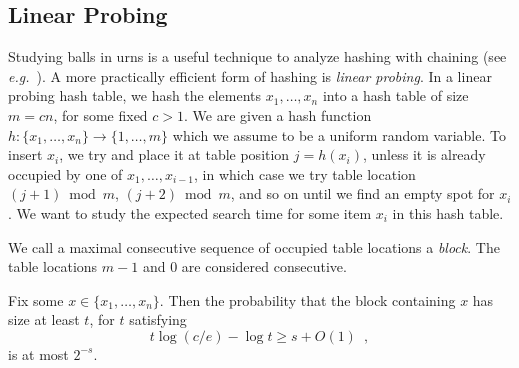 \documentclass{patmorin}
\begin{document}
\subsection{Linear Probing}

Studying balls in urns is a useful technique to analyze hashing with
chaining (see \emph{e.g.}~\cite[Section~5.1]{morin:open}). A more
practically efficient form of hashing is \emph{linear probing}.  In a
linear probing hash table, we hash the elements $x_1, \ldots, x_n$
into a hash table of size $m=cn$, for some fixed $c> 1$. We are given
a hash function $h : \{x_1, \ldots, x_n\} \to \{1, \ldots, m\}$ which
we assume to be a uniform random variable. To insert $x_i$, we try and
place it at table position $j=h(x_i)$, unless it is already occupied
by one of $x_1,\ldots,x_{i-1}$, in which case we try table location
$(j+1)\bmod m$, $(j+2)\bmod m$, and so on until we find an empty spot
for $x_i$.  We want to study the expected search time for some item
$x_i$ in this hash table.

We call a maximal consecutive sequence of occupied table locations a
\emph{block}. The table locations $m-1$ and $0$ are considered
consecutive.

\begin{thm}
  Fix some $x\in\{x_1,\ldots,x_n\}$. Then the probability that the
  block containing $x$ has size at least $t$, for $t$ satisfying
  \[
    t \log (c/e) - \log t \ge s + O(1) \enspace ,
  \]
  is at most $2^{-s}$.
\end{thm}
\end{document}
